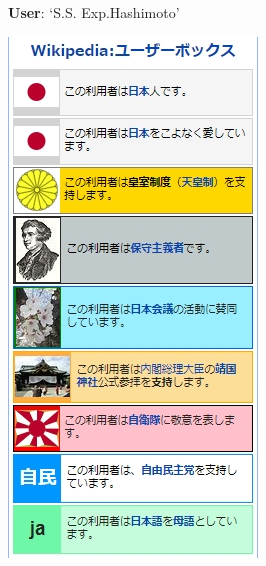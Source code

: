\documentclass[10pt,british,A4paper,,openany]{memoir}
\begin{document}
\begin{figure}[!htb]
\begin{subfigure}[b]{0.3\textwidth}
  \caption{\textbf{User}: `S.S. Exp.Hashimoto'}
  \label{fig:hashimoto}
 \end{subfigure}
  \begin{subfigure}[b]{0.3\textwidth}
  \includegraphics[width=\textwidth]{images/wiki/defense-corps.jpg}

\end{subfigure}
\end{figure}
\end{document}
